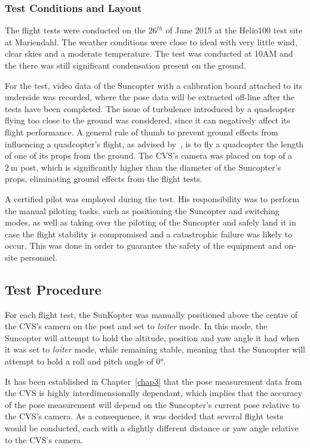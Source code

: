 \subsubsection{Test Conditions and Layout}

The flight tests were conducted on the 26$^{th}$ of June 2015 at the Helio100 test site at Mariendahl. The weather conditions were close to ideal with very little wind, clear skies and a moderate temperature. The test was conducted at 10AM and the there was still significant condensation present on the ground. %

For the test, video data of the Suncopter with a calibration board attached to its underside was recorded, where the pose data will be extracted off-line after the tests have been completed. The issue of turbulence introduced by a quadcopter flying too close to the ground was considered, since it can negatively affect its flight performance. A general rule of thumb to prevent ground effects from influencing a quadcopter's flight, as advised by~\cite{basson-flight-test}, is to fly a quadcopter the length of one of its props from the ground. The CVS's camera was placed on top of a $\SI{2}{\m}$ post, which is significantly higher than the diameter of the Suncopter's props, eliminating ground effects from the flight tests.

A certified pilot was employed during the test. His responsibility was to perform the manual piloting tasks, such as positioning the Suncopter and switching modes, as well as taking over the piloting of the Suncopter and safely land it in case the flight stability is compromised and a catastrophic failure was likely to occur. This was done in order to guarantee the safety of the equipment and on-site personnel. 

\subsection{Test Procedure}

For each flight test, the SunKopter was manually positioned above the centre of the CVS's camera on the post and set to \emph{loiter} mode. In this mode, the Suncopter will attempt to hold the altitude, position and yaw angle it had when it was set to \emph{loiter} mode, while remaining stable, meaning that the Suncopter will attempt to hold a roll and pitch angle of $\ang{0}$. 

It has been established in Chapter~\ref{chap3} that the pose measurement data from the CVS is highly interdimensionally dependant, which implies that the accuracy of the pose measurement will depend on the Suncopter's current pose relative to the CVS's camera. As a consequence, it was decided that several flight tests would be conducted, each with a slightly different distance or yaw angle relative to the CVS's camera. 

